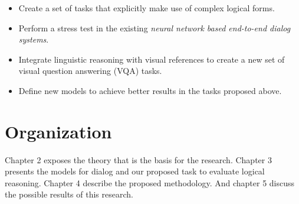\begin{itemize}
\item Create a set of tasks that explicitly make use of complex logical forms.
\item Perform a stress test in the existing \textit{neural network based end-to-end dialog systems}.
\item Integrate linguistic reasoning with visual references to create a new set of visual question answering (VQA) tasks.
\item Define new models to achieve better results in the tasks proposed above. 
\end{itemize}

\section{Organization}
\label{sec:organization}

Chapter 2 exposes the theory that is the basis for the research. Chapter 3 presents the models for dialog and our proposed task to evaluate logical reasoning. Chapter 4 describe the proposed methodology. And chapter 5 discuss the possible results of this research.
